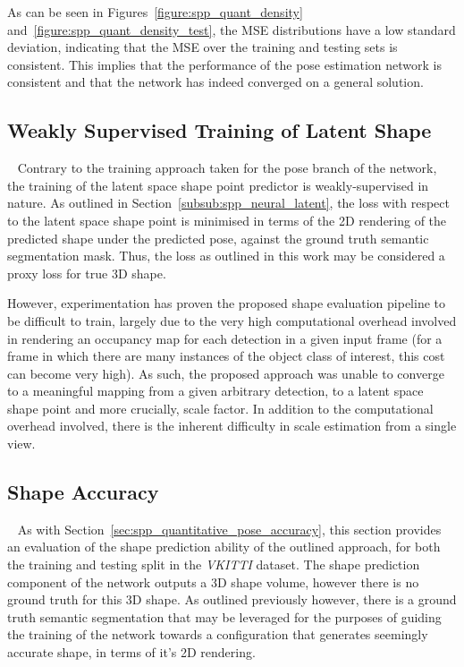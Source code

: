 As can be seen in Figures~\ref{figure:spp_quant_density} and~\ref{figure:spp_quant_density_test}, the MSE distributions 
have a low standard deviation, indicating that the MSE over the training and testing sets is consistent. This implies 
that the performance of the pose estimation network is consistent and that the network has indeed converged on a 
general solution.

\subsection{Weakly Supervised Training of Latent Shape}
~\label{sec:spp_quantitative_latentshape_train}
Contrary to the training approach taken for the pose branch of the network, the training of the latent space shape 
point predictor is weakly-supervised in nature. As outlined in Section~\ref{subsub:spp_neural_latent}, the loss with 
respect to the latent space shape point is minimised in terms of the 2D rendering of the predicted shape under the 
predicted pose, against the ground truth semantic segmentation mask. Thus, the loss as outlined in this work may be 
considered a proxy loss for true 3D shape. 

However, experimentation has proven the proposed shape evaluation pipeline to be difficult to train, largely due to the very 
high computational overhead involved in rendering an occupancy map for each detection in a given input frame (for a frame 
in which there are many instances of the object class of interest, this cost can become very high). As such, the proposed 
approach was unable to converge to a meaningful mapping from a given arbitrary detection, to a latent space shape point and 
more crucially, scale factor. In addition to the computational overhead involved, there is the inherent difficulty in scale 
estimation from a single view.

\iffalse
\subsection{Shape Accuracy}
~\label{sec:spp_quantitative_pose_accuracy}
As with Section~\ref{sec:spp_quantitative_pose_accuracy}, this section provides an evaluation of the shape prediction ability 
of the outlined approach, for both the training and testing split in the \textit{VKITTI} dataset. The shape prediction component 
of the network outputs a 3D shape volume, however there is no ground truth for this 3D shape. As outlined previously however, 
there is a ground truth semantic segmentation that may be leveraged for the purposes of guiding the training of the network towards 
a configuration that generates seemingly accurate shape, in terms of it's 2D rendering. 


